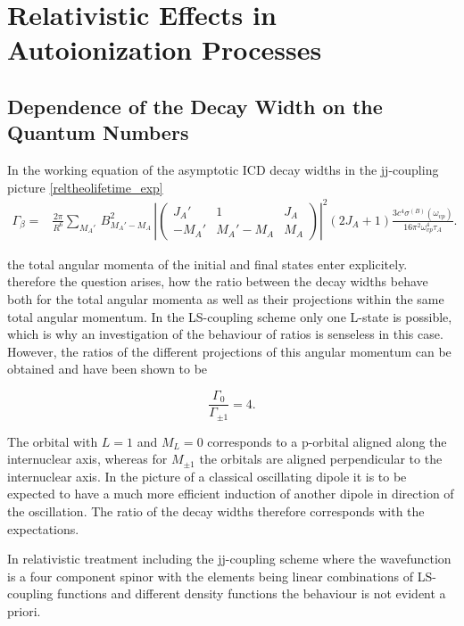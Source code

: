 \chapter{Relativistic Effects in Autoionization Processes}


\section{Dependence of the Decay Width on the Quantum Numbers}

In the working equation of the asymptotic \ac{ICD} decay widths in the jj-coupling
picture \ref{reltheolifetime_exp}
\begin{align}
 \Gamma_\beta =& \frac{2\pi}{R^6} \sum\limits_{M_A'} \, B_{M_A'-M_A}^2 \, \left| \left(
\begin{array}{ccc}
J_A'  & 1        & J_A\\
-M_A' & M_A'-M_A & M_A
\end{array}\right) \right|^2
 (2J_A+1)\frac{3c^4 \sigma^{(B)}(\omega_{vp})}{16\pi^2\omega_{vp}^4\tau_A} .
\end{align}

the total angular momenta of the initial and final states enter explicitely.
therefore the question arises, how the ratio between the decay widths behave
both for the total angular momenta as well as their projections within the
same total angular momentum. In the LS-coupling scheme only one L-state is possible,
which is why an investigation of the behaviour of ratios is senseless in this
case. However, the ratios of the different projections of this angular momentum
can be obtained and have been shown to be \cite{Gokhberg10_1}

\begin{equation}
  \frac{\Gamma_0}{\Gamma_{\pm 1}} = 4  .
\end{equation}

The orbital with $L=1$ and $M_L=0$ corresponds to a p-orbital aligned along
the internuclear axis, whereas for $M_{\pm 1}$ the orbitals are aligned perpendicular
to the internuclear axis. In the picture of a classical oscillating dipole it is
to be expected to have a much more efficient induction of another dipole
in direction of the oscillation. The ratio of the decay widths therefore
corresponds with the expectations.

In relativistic treatment including the jj-coupling scheme where the wavefunction
is a four component spinor with the elements being linear combinations
of LS-coupling functions and different density functions the behaviour is
not evident a priori.

